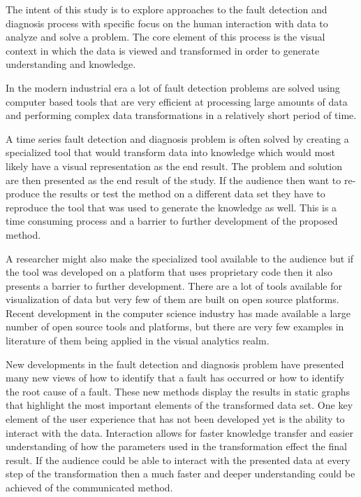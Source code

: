 The intent of this study is to explore approaches to the fault detection and diagnosis process with specific focus on the human interaction with data to analyze and solve a problem. The core element of this process is the visual context in which the data is viewed and transformed in order to generate understanding and knowledge.\par
In the modern industrial era a lot of fault detection problems are solved using computer based tools that are very efficient at processing large amounts of data and performing complex data transformations in a relatively short period of time.\par
A time series fault detection and diagnosis problem is often solved by creating a specialized tool that would transform data into knowledge which would most likely have a visual representation as the end result. The problem and solution are then presented as the end result of the study. If the audience then want to re-produce the results or test the method on a different data set they have to reproduce the tool that was used to generate the knowledge as well. This is a time consuming process and a barrier to further development of the proposed method.\par
A researcher might also make the specialized tool available to the audience but if the tool was developed on a platform that uses proprietary code then it also presents a barrier to further development. There are a lot of tools available for visualization of data but very few of them are built on open source platforms. Recent development in the computer science industry has made available a large number of open source tools and platforms, but there are very few examples in literature of them being applied in the visual analytics realm.\par
New developments in the fault detection and diagnosis problem have presented many new views of how to identify that a fault has occurred or how to identify the root cause of a fault. These new methods display the results in static graphs that highlight the most important elements of the transformed data set. One key element of the user experience that has not been developed yet is the ability to interact with the data. Interaction allows for faster knowledge transfer and easier understanding of how the parameters used in the transformation effect the final result. If the audience could be able to interact with the presented data at every step of the transformation then a much faster and deeper understanding could be achieved of the communicated method.

